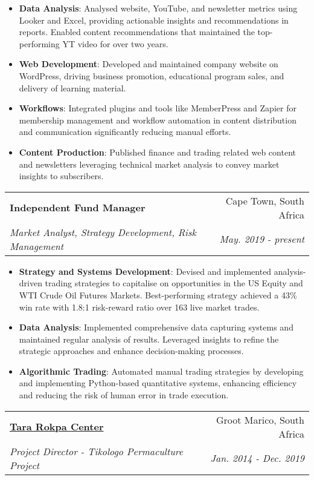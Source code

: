 \documentclass[a4paper,11pt]{article}
\makeatletter
\newcommand{\resumeItem}[2]{
  \item\small{
    \textbf{#1}{: #2 \vspace{-2pt}}
  }
}
\newcommand{\resumeSubheading}[4]{
  \vspace{-1pt}\item
    \begin{tabular*}{0.97\textwidth}[t]{l@{\extracolsep{\fill}}r}
      \textbf{#1} & #2 \\
      \textit{\small#3} & \textit{\small #4} \\
  \end{tabular*}\vspace{-10pt}
}
\newcommand{\resumeItemListStart}{\begin{itemize}}
\newcommand{\resumeItemListEnd}{\end{itemize}\vspace{-10pt}}
\makeatother
\begin{document}
      \resumeItemListStart
        \resumeItem{Data Analysis}
          {Analysed website, YouTube, and newsletter metrics using Looker and Excel, providing actionable insights and recommendations in reports. Enabled content recommendations that maintained the top-performing YT video for over two years.}
        \resumeItem{Web Development}
          {Developed and maintained company website on WordPress, driving business promotion, educational program sales, and delivery of learning material.}
        \resumeItem{Workflows}
          {Integrated plugins and tools like MemberPress and Zapier for membership management and workflow automation in content distribution and communication significantly reducing manual efforts.}
        \resumeItem{Content Production}
          {Published finance and trading related web content and newsletters leveraging technical market analysis to convey market insights to subscribers.}
      \resumeItemListEnd

    \resumeSubheading
      {Independent Fund Manager}{Cape Town, South Africa}
      {Market Analyst, Strategy Development, Risk Management}{May. 2019 - present}
      
      \resumeItemListStart
        \resumeItem{Strategy and Systems Development}
          {Devised and implemented analysis-driven trading strategies to capitalise on opportunities in the US Equity and WTI Crude Oil Futures Markets. Best-performing strategy achieved a 43\% win rate with 1.8:1 risk-reward ratio over 163 live market trades.}
        \resumeItem{Data Analysis}
          {Implemented comprehensive data capturing systems and maintained regular analysis of results. Leveraged insights to refine the strategic approaches and enhance decision-making processes.}
        \resumeItem{Algorithmic Trading}
          {Automated manual trading strategies by developing and implementing Python-based quantitative systems, enhancing efficiency and reducing the risk of human error in trade execution.}
      \resumeItemListEnd

    \resumeSubheading
      {\href{https://tararokpacentre.co.za/about-tikologo/}{Tara Rokpa Center}}{Groot Marico, South Africa}
      {Project Director - Tikologo Permaculture Project}{Jan. 2014 - Dec. 2019}
      
\end{document}
